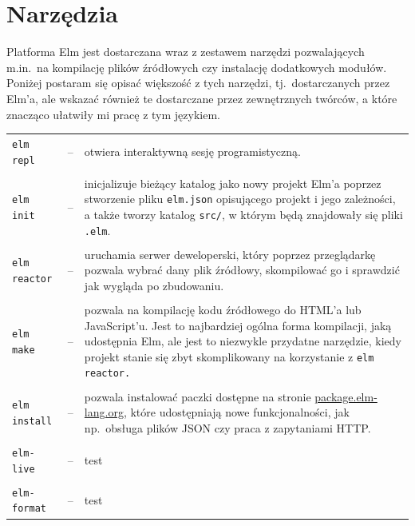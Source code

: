 \documentclass[twoside,a4paper]{report}
\begin{document}
\section{Narzędzia}
Platforma Elm jest dostarczana wraz z zestawem narzędzi pozwalających m.in.~na kompilację plików źródłowych czy instalację dodatkowych modułów. Poniżej postaram się opisać większość z tych narzędzi, tj.~dostarczanych przez Elm'a, ale wskazać również te dostarczane przez zewnętrznych twórców, a które znacząco ułatwiły mi pracę z tym językiem.
\begin{center}
    \begin{tabularx}{\textwidth}{llX}
        \texttt{elm repl} &--& otwiera interaktywną sesję programistyczną.\\&\\
        \texttt{elm init} &--& inicjalizuje bieżący katalog jako nowy projekt Elm'a poprzez stworzenie pliku \texttt{elm.json} opisującego projekt i jego zależności, a także tworzy katalog \texttt{src/}, w którym będą znajdowały się pliki \texttt{.elm}.\\&\\
        \texttt{elm reactor} &--& uruchamia serwer deweloperski, który poprzez przeglądarkę pozwala wybrać dany plik źródłowy, skompilować go i sprawdzić jak wygląda po zbudowaniu.\\&\\
        \texttt{elm make} &--& pozwala na kompilację kodu źródłowego do HTML'a lub JavaScript'u. Jest to najbardziej ogólna forma kompilacji, jaką udostępnia Elm, ale jest to niezwykle przydatne narzędzie, kiedy projekt stanie się zbyt skomplikowany na korzystanie z \texttt{elm reactor.}\\&\\
        \texttt{elm install} &--& pozwala instalować paczki dostępne na stronie \url{package.elm-lang.org}, które udostępniają nowe funkcjonalności, jak np.~obsługa plików JSON czy praca z zapytaniami HTTP.\\&\\
        \texttt{elm-live~\cite{elm-live}} &--& test\\&\\
        \texttt{elm-format~\cite{elm-format}} &--& test\\
    \end{tabularx}
\end{center}
\end{document}
